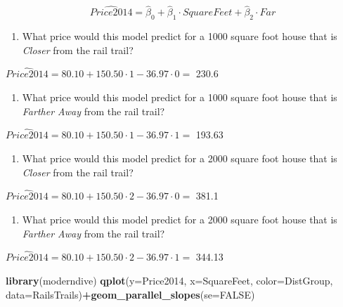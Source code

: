 \documentclass[]{article}
\newenvironment{Shaded}{\begin{snugshade}}{\end{snugshade}}
\newcommand{\DataTypeTok}[1]{\textcolor[rgb]{0.13,0.29,0.53}{#1}}
\newcommand{\KeywordTok}[1]{\textcolor[rgb]{0.13,0.29,0.53}{\textbf{#1}}}
\newcommand{\NormalTok}[1]{#1}
\newcommand{\OperatorTok}[1]{\textcolor[rgb]{0.81,0.36,0.00}{\textbf{#1}}}
\newcommand{\OtherTok}[1]{\textcolor[rgb]{0.56,0.35,0.01}{#1}}
\providecommand{\tightlist}{%
  \setlength{\itemsep}{0pt}\setlength{\parskip}{0pt}}
\begin{document}
\textbf{\[\widehat{Price2014} = \hat{\beta}_0 + \hat{\beta}_1 \cdot SquareFeet + \hat{\beta}_2 \cdot Far\]}

\begin{enumerate}
\def\labelenumi{\arabic{enumi}.}
\tightlist
\item
  What price would this model predict for a 1000 square foot house that
  is \emph{Closer} from the rail trail?
\end{enumerate}

\(\widehat{Price2014} = 80.10 + 150.50 \cdot 1 -36.97 \cdot 0 =\) 230.6

\begin{enumerate}
\def\labelenumi{\arabic{enumi}.}
\setcounter{enumi}{1}
\tightlist
\item
  What price would this model predict for a 1000 square foot house that
  is \emph{Farther Away} from the rail trail?
\end{enumerate}

\(\widehat{Price2014} = 80.10 + 150.50 \cdot 1 -36.97 \cdot 1=\) 193.63

\begin{enumerate}
\def\labelenumi{\arabic{enumi}.}
\setcounter{enumi}{2}
\tightlist
\item
  What price would this model predict for a 2000 square foot house that
  is \emph{Closer} from the rail trail?
\end{enumerate}

\(\widehat{Price2014} = 80.10 + 150.50 \cdot 2 -36.97 \cdot 0=\) 381.1

\begin{enumerate}
\def\labelenumi{\arabic{enumi}.}
\setcounter{enumi}{3}
\tightlist
\item
  What price would this model predict for a 2000 square foot house that
  is \emph{Farther Away} from the rail trail?
\end{enumerate}

\(\widehat{Price2014} = 80.10 + 150.50 \cdot 2 -36.97 \cdot 1=\) 344.13

\begin{Shaded}
\begin{Highlighting}[]
\KeywordTok{library}\NormalTok{(moderndive)}
\KeywordTok{qplot}\NormalTok{(}\DataTypeTok{y=}\NormalTok{Price2014, }\DataTypeTok{x=}\NormalTok{SquareFeet, }\DataTypeTok{color=}\NormalTok{DistGroup, }\DataTypeTok{data=}\NormalTok{RailsTrails)}\OperatorTok{+}\KeywordTok{geom_parallel_slopes}\NormalTok{(}\DataTypeTok{se=}\OtherTok{FALSE}\NormalTok{)}
\end{Highlighting}
\end{Shaded}
\end{document}
